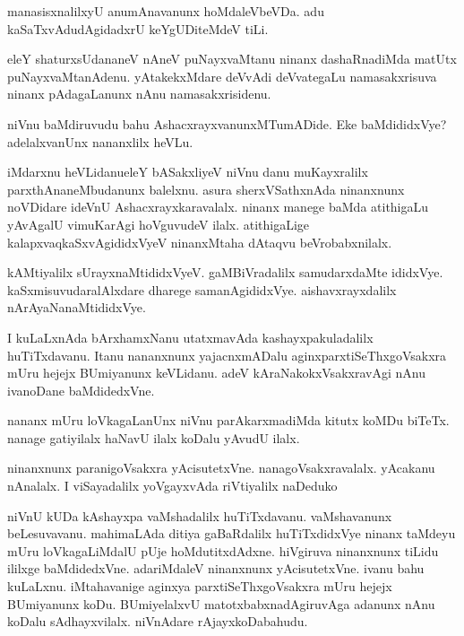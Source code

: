\begin{mng}
manasisxnalilxyU anumAnavanunx hoMdaleVbeVDa. adu kaSaTxvAdudAgidadxrU keYgUDiteMdeV tiLi.
\end{mng}

\begin{mng}
eleY shaturxsUdananeV nAneV puNayxvaMtanu ninanx dashaRnadiMda matUtx puNayxvaMtanAdenu. yAtakekxMdare deVvAdi deVvategaLu namasakxrisuva ninanx pAdagaLanunx nAnu namasakxrisidenu.
\end{mng}

\begin{mng}
niVnu baMdiruvudu bahu AshacxrayxvanunxMTumADide. Eke baMdididxVye? adelalxvanUnx nananxlilx heVLu.
\end{mng}

\begin{mng}
iMdarxnu heVLidanu\mdash eleY bASakxliyeV niVnu danu muKayxralilx parxthAnaneMbudanunx balelxnu. asura sherxVSathxnAda ninanxnunx noVDidare ideVnU Ashacxrayxkaravalalx. ninanx manege baMda atithigaLu yAvAgalU vimuKarAgi hoVguvudeV ilalx. atithigaLige kalapxvaqkaSxvAgididxVyeV ninanxMtaha dAtaqvu beVrobabxnilalx.
\end{mng}

\begin{mng}
kAMtiyalilx sUrayxnaMtididxVyeV. gaMBiVradalilx samudarxdaMte ididxVye. kaSxmisuvudaralAlxdare dharege samanAgididxVye. aishavxrayxdalilx nArAyaNanaMtididxVye.
\end{mng}

\begin{mng}
I kuLaLxnAda bArxhamxNanu utatxmavAda kashayxpakuladalilx huTiTxdavanu. Itanu nananxnunx yajacnxmADalu aginxparxtiSeThxgoVsakxra mUru hejejx BUmiyanunx keVLidanu. adeV kAraNakokxVsakxravAgi nAnu ivanoDane baMdidedxVne.
\end{mng}

\begin{mng}
nananx mUru loVkagaLanUnx niVnu parAkarxmadiMda kitutx koMDu biTeTx. nanage gatiyilalx haNavU ilalx koDalu yAvudU ilalx.
\end{mng}

\begin{mng}
ninanxnunx paranigoVsakxra yAcisutetxVne. nanagoVsakxravalalx. yAcakanu nAnalalx. I viSayadalilx yoVgayxvAda riVtiyalilx naDeduko
\end{mng}

\begin{mng}
niVnU kUDa kAshayxpa vaMshadalilx huTiTxdavanu. vaMshavanunx beLesuvavanu. mahimaLAda ditiya gaBaRdalilx huTiTxdidxVye ninanx taMdeyu mUru loVkagaLiMdalU pUje hoMdutitxdAdxne. hiVgiruva ninanxnunx tiLidu ililxge baMdidedxVne. adariMdaleV ninanxnunx yAcisutetxVne. ivanu bahu kuLaLxnu. iMtahavanige aginxya parxtiSeThxgoVsakxra mUru hejejx BUmiyanunx koDu. BUmiyelalxvU matotxbabxnadAgiruvAga adanunx nAnu koDalu sAdhayxvilalx. niVnAdare rAjayxkoDabahudu.
\end{mng}


